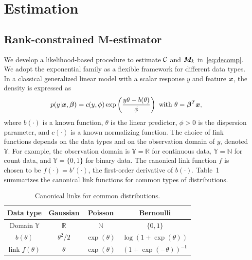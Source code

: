 \documentclass[12pt]{article}
\theoremstyle{definition}
\theoremstyle{definition}
\begin{document}
\section{Estimation}\label{sec:est}

\subsection{Rank-constrained M-estimator}
We develop a likelihood-based procedure to estimate $\mathcal{C}$ and $\bm M_k$ in~\eqref{eq:decomp}. We adopt the exponential family as a flexible framework for different data types. In a classical generalized linear model with a scalar response $y$ and feature $\bm x$, the density is expressed as
\[
p(y|\mx, \boldsymbol{\beta})=c(y,\phi)\exp\left(\frac{y\theta- b(\theta)}{\phi}\right)\ \text{with}\ \theta=\boldsymbol{\beta}^T\mx,
\]
where $b(\cdot)$ is a known function, $\theta$ is the linear predictor, $\phi>0$ is the dispersion parameter, and $c(\cdot)$ is a known normalizing function. The choice of link functions depends on the data types and on the observation domain of $y$, denoted $\mathbb{Y}$. For example, the observation domain is $\mathbb{Y}=\mathbb{R}$ for continuous data, $\mathbb{Y}=\mathbb{N}$ for count data, and  $\mathbb{Y}=\{0,1\}$ for binary data. The canonical link function $f$ is chosen to be $f(\cdot)=b'(\cdot)$, the first-order derivative of $b(\cdot)$. Table~1 summarizes the canonical link functions for common types of distributions. 

\begin{table}[htb]
\centering
\begin{tabular}{c|ccc}
Data type &Gaussian & Poisson& Bernoulli\\
\hline
Domain $\mathbb{Y}$& $\mathbb{R}$&$\mathbb{N}$&$\{0,1\}$\\
 $b(\theta)$&$\theta^2/2$& $\exp(\theta)$&$\log (1+\exp(\theta))$\\
 link $f(\theta)$&$\theta$&$\exp(\theta)$&$(1+\exp(-\theta))^{-1}$
\end{tabular}
\vspace{-.2cm}
\caption{Canonical links for common distributions.}\label{table:link}
\end{table}
\end{document}
